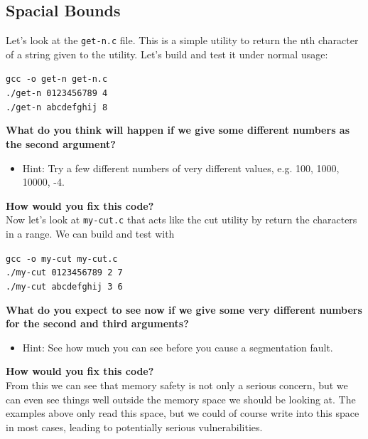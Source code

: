 \documentclass{article}
\begin{document}
\subsection{Spacial Bounds}
Let's look at the \lstinline{get-n.c} file. This is a simple utility to return the nth character of a string given to the utility. Let's build and test it under normal usage:

\begin{center}
    \lstinline{gcc -o get-n get-n.c}\\
    \lstinline{./get-n 0123456789 4}\\
    \lstinline{./get-n abcdefghij 8}
\end{center}
\noindent\textbf{What do you think will happen if we give some different numbers as the second argument?}
\begin{itemize}
    \item Hint: Try a few different numbers of very different values, e.g. 100, 1000, 10000, -4.
\end{itemize}
\noindent\textbf{How would you fix this code?}\\

\noindent Now let's look at \lstinline{my-cut.c} that acts like the cut utility by return the characters in a range. We can build and test with
\begin{center}
    \lstinline{gcc -o my-cut my-cut.c}\\
    \lstinline{./my-cut 0123456789 2 7}\\
    \lstinline{./my-cut abcdefghij 3 6}
\end{center}
\noindent\textbf{What do you expect to see now if we give some very different numbers for the second and third arguments?}
\begin{itemize}
    \item Hint: See how much you can see before you cause a segmentation fault.
\end{itemize}
\noindent\textbf{How would you fix this code?}\\

\noindent From this we can see that memory safety is not only a serious concern, but we can even see things well outside the memory space we should be looking at. The examples above only read this space, but we could of course write into this space in most cases, leading to potentially serious vulnerabilities.
\end{document}
